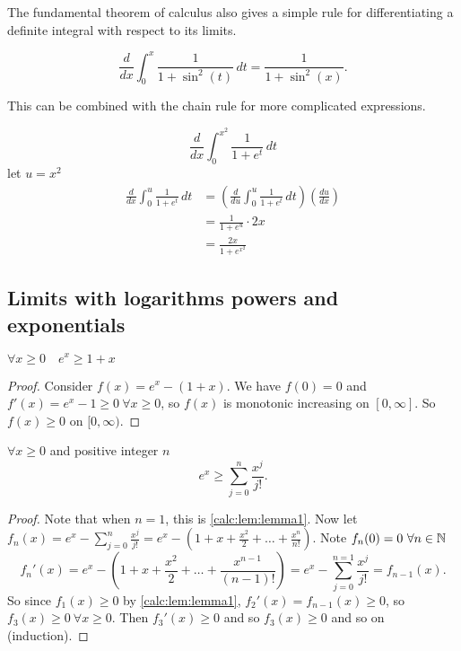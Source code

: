 \documentclass[10pt, a4paper]{article}
\begin{document}
The fundamental theorem of calculus also gives a simple rule for differentiating a definite integral with respect to its limits.
\begin{example}
    \[
    \frac{d}{dx}\int_0^x\frac{1}{1 + \sin ^ 2 (t)}\,dt = \frac{1}{1 + \sin ^ 2 (x)}.
    \]
\end{example}
This can be combined with the chain rule for more complicated expressions.
\begin{example}
    \[
    \frac{d}{dx}\int_0^{x ^ 2}\frac{1}{1 + e ^ t}\,dt
    \]
    let $u = x ^ 2$
    \begin{align*}
    \frac{d}{dx}\int_0^u\frac{1}{1 + e ^ t}\,dt &= \left(\frac{d}{du}\int_0^u\frac{1}{1 + e ^ t}\,dt\right)\left(\frac{du}{dx}\right) \\
    &= \frac{1}{1 + e ^ u} \cdot 2x \\
    &= \frac{2x}{1 + e ^ {x ^ 2}}
    \end{align*}
\end{example}

\subsection{Limits with logarithms powers and exponentials}
\begin{lemma}\label{calc:lem:lemma1}
    $\forall x \geq 0\quad e ^ x \geq 1 + x$
    \begin{proof}
        Consider $f(x) = e ^ x - (1 + x)$.
        We have $f(0) = 0$ and $f'(x) = e ^ x - 1 \geq 0\ \forall x \geq 0$,
        so $f(x)$ is monotonic increasing on $[0, \infty]$.
        So $f(x) \geq 0$ on $[0, \infty)$.
    \end{proof}
\end{lemma}
\begin{lemma}\label{calc:lem:lemma2}
    $\forall x \geq 0$ and positive integer $n$
    \[
    e ^ x \geq \sum_{j = 0}^{n}\frac{x ^ j}{j!}.
    \]
    \begin{proof}
        Note that when $n = 1$,
        this is \autoref{calc:lem:lemma1}.
        Now let $f_n(x) = e ^ x - \sum_{j = 0}^n\frac{x ^ j}{j!} = e ^ x - \left(1 + x + \frac{x ^ 2}{2} + \dotsc + \frac{x ^ n}{n!}\right)$.
        Note $f_n(0) = 0\ \forall n \in \mathbb{N}$
        \[
        f_n'(x) = e ^ x - \left(1 + x + \frac{x ^ 2}{2} + \dotsc + \frac{x ^ {n - 1}}{(n - 1)!}\right) = e ^ x - \sum_{j = 0}^{n = 1}\frac{x ^ j}{j!} = f_{n - 1}(x).
        \]
        So since $f_1(x) \geq 0$ by \autoref{calc:lem:lemma1},
        $f_2'(x) = f_{n - 1}(x) \geq 0$,
        so
        $f_3(x) \geq 0\ \forall x \geq 0$.
        Then $f_3'(x) \geq 0$ and so $f_3(x) \geq 0$ and so on (induction).
    \end{proof}
\end{lemma}
\end{document}
